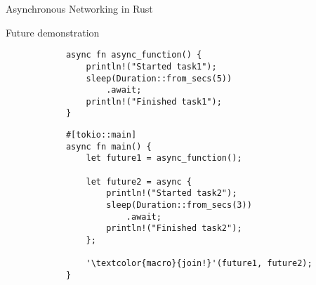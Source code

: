 \begin{frame}[fragile]{Asynchronous Networking in Rust}
    \begin{block}{Future demonstration}
        \begin{overprint}
            \begin{verbatim}
            async fn async_function() {
                println!("Started task1");
                sleep(Duration::from_secs(5))
                    .await;
                println!("Finished task1");
            }
            \end{verbatim}

            \begin{verbatim}
            #[tokio::main]
            async fn main() {
                let future1 = async_function();

                let future2 = async {
                    println!("Started task2");
                    sleep(Duration::from_secs(3))
                        .await;
                    println!("Finished task2");
                };

                '\textcolor{macro}{join!}'(future1, future2);
            }
            \end{verbatim}
        \end{overprint}
    \end{block}

\end{frame}
